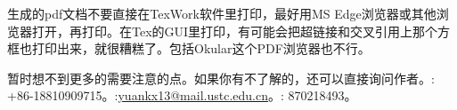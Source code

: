生成的pdf文档不要直接在TexWork软件里打印，最好用MS Edge浏览器或其他浏览器打开，再打印。在Tex的GUI里打印，有可能会把超链接和交叉引用上那个方框也打印出来，就很糟糕了。包括Okular这个PDF浏览器也不行。\par
暂时想不到更多的需要注意的点。如果你有不了解的，还可以直接询问作者。\faPhone: +86-18810909715。\faEnvelope :\href{mailto:yuankx13@mail.ustc.edu.cn}{yuankx13@mail.ustc.edu.cn}。\faQq : 870218493。